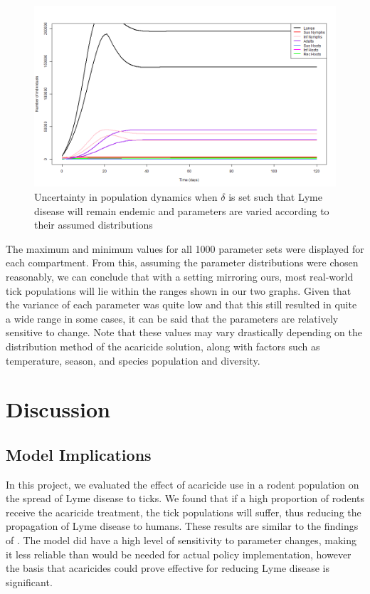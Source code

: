 \documentclass[12pt, centerh1]{article}
\begin{document}
\begin{figure}[h]
    \centering
    \includegraphics[scale = 0.4]{figures/uncertainty_endemic.png}
    \caption{Uncertainty in population dynamics when $\delta$ is set such that Lyme disease will remain endemic and parameters are varied according to their assumed distributions}
    \label{fig:un_endemic}
\end{figure}

The maximum and minimum values for all 1000 parameter sets were displayed for each compartment. From this, assuming the parameter distributions were chosen reasonably, we can conclude that with a setting mirroring ours, most real-world tick populations will lie within the ranges shown in our two graphs. Given that the variance of each parameter was quite low and that this still resulted in quite a wide range in some cases, it can be said that the parameters are relatively sensitive to change. Note that these values may vary drastically depending on the distribution method of the acaricide solution, along with factors such as temperature, season, and species population and diversity.

\section{Discussion}

\subsection{Model Implications}

In this project, we evaluated the effect of acaricide use in a rodent population on the spread of Lyme disease to ticks. We found that if a high proportion of rodents receive the acaricide treatment, the tick populations will suffer, thus reducing the propagation of Lyme disease to humans. These results are similar to the findings of \citet{tosato2021host}. The model did have a high level of sensitivity to parameter changes, making it less reliable than would be needed for actual policy implementation, however the basis that acaricides could prove effective for reducing Lyme disease is significant.
\end{document}
